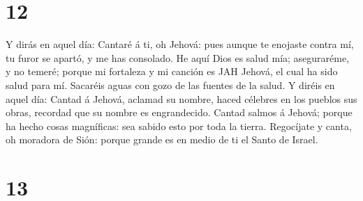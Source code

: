 \hypertarget{section-11}{%
\section{12}\label{section-11}}

 Y dirás en aquel día: Cantaré á ti, oh Jehová: pues
aunque te enojaste contra mí, tu furor se apartó, y me has consolado.
 He aquí Dios es salud mía; aseguraréme, y no temeré;
porque mi fortaleza y mi canción es JAH Jehová, el cual ha sido salud
para mí.  Sacaréis aguas con gozo de las fuentes de la
salud.  Y diréis en aquel día: Cantad á Jehová, aclamad su
nombre, haced célebres en los pueblos sus obras, recordad que su nombre
es engrandecido.  Cantad salmos á Jehová; porque ha hecho
cosas magníficas: sea sabido esto por toda la tierra. 
Regocíjate y canta, oh moradora de Sión: porque grande es en medio de ti
el Santo de Israel.

\hypertarget{section-12}{%
\section{13}\label{section-12}}

